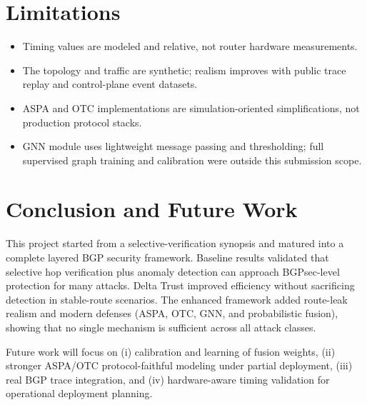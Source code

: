 \documentclass[conference]{IEEEtran}
\begin{document}
\section{Limitations}
\begin{itemize}
\item Timing values are modeled and relative, not router hardware measurements.
\item The topology and traffic are synthetic; realism improves with public trace replay and control-plane event datasets.
\item ASPA and OTC implementations are simulation-oriented simplifications, not production protocol stacks.
\item GNN module uses lightweight message passing and thresholding; full supervised graph training and calibration were outside this submission scope.
\end{itemize}

\section{Conclusion and Future Work}
This project started from a selective-verification synopsis and matured into a complete layered BGP security framework. Baseline results validated that selective hop verification plus anomaly detection can approach BGPsec-level protection for many attacks. Delta Trust improved efficiency without sacrificing detection in stable-route scenarios. The enhanced framework added route-leak realism and modern defenses (ASPA, OTC, GNN, and probabilistic fusion), showing that no single mechanism is sufficient across all attack classes.

Future work will focus on (i) calibration and learning of fusion weights, (ii) stronger ASPA/OTC protocol-faithful modeling under partial deployment, (iii) real BGP trace integration, and (iv) hardware-aware timing validation for operational deployment planning.
\end{document}
